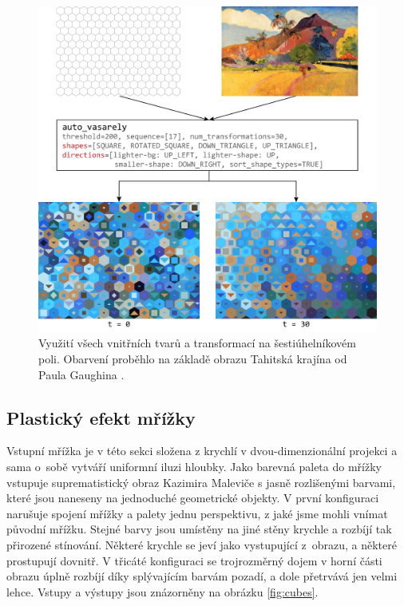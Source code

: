 \begin{figure}[H]
    \centering
    \includegraphics[width=\textwidth]{obrazky-figures/hexagons.pdf}
    \caption{Využití všech vnitřních tvarů a transformací na šestiúhelníkovém poli. Obarvení proběhlo na základě obrazu Tahitská krajína od Paula Gaughina \cite{tahiti}. }
    \label{fig:hexagons}
\end{figure}

\subsection*{Plastický efekt mřížky}

Vstupní mřížka je v této sekci složena z krychlí v dvou-dimenzionální projekci a sama o~sobě vytváří uniformní iluzi hloubky. Jako barevná paleta do mřížky vstupuje suprematistický obraz Kazimira Maleviče \cite{suprematism} s jasně rozlišenými barvami, které jsou naneseny na jednoduché geometrické objekty. V první konfiguraci narušuje spojení mřížky a palety jednu perspektivu, z jaké jsme mohli vnímat původní mřížku. Stejné barvy jsou umístěny na jiné stěny krychle a rozbíjí tak přirozené stínování. Některé krychle se jeví jako vystupující z~obrazu, a některé prostupují dovnitř. V třicáté konfiguraci se trojrozměrný dojem v horní části obrazu úplně rozbíjí díky splývajícím barvám pozadí, a dole přetrvává jen velmi lehce. Vstupy a výstupy jsou znázorněny na obrázku \ref{fig:cubes}.

